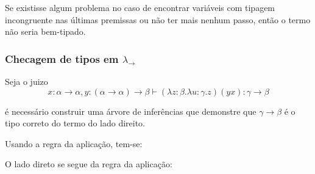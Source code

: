 \documentclass[../main.tex]{subfiles}
\begin{document}
Se existisse algum problema no caso de encontrar variáveis com tipagem incongruente nas últimas premissas ou não ter mais nenhum passo, então o termo não seria bem-tipado.



\subsubsection{Checagem de tipos em $\lambda_\to$}

Seja o juizo $$x : \alpha \to \alpha, y : (\alpha \to \alpha) \to \beta \vdash (\lambda z : \beta . \lambda u : \gamma . z)(yx) : \gamma \to \beta$$

é necessário construir uma árvore de inferências que demonstre que $\gamma \to \beta$ é o tipo correto do termo do lado direito.

\begin{prooftree}
\end{prooftree}

Usando a regra da aplicação, tem-se:

\begin{prooftree}
\end{prooftree}

O lado direto se segue da regra da aplicação:

\begin{prooftree}
\end{prooftree}
\end{document}
